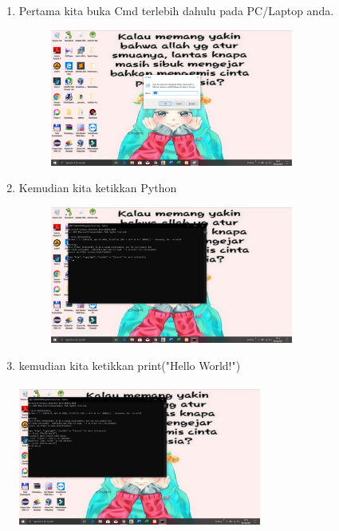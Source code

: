 \documentclass{article}
\begin{document}
\begin{enumerate}
    \item Pertama kita buka Cmd terlebih dahulu pada PC/Laptop anda.
        \begin{figure}[h]
            \centerline{\includegraphics[width=8cm]{image/cmd.png}}
        \end{figure}
    \item Kemudian kita ketikkan Python
        \begin{figure}[h]
            \centerline{\includegraphics[width=8cm]{image/python.png}}
        \end{figure}
    \newpage \item kemudian kita ketikkan print("Hello World!")
    \paragraph{}
            \centerline{\includegraphics[width=8cm]{image/printhelloworld.png}}
\end{enumerate}
\end{document}

